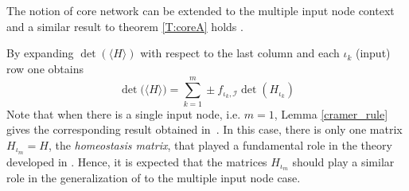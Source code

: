 \documentclass[a4paper,fleqn]{cas-dc}
\newcommand{\END}{\hfill\mbox{\raggedright \mbox{\raisebox{2pt}{\scalebox{0.6}{$\Diamond$}}}}\medskip}
\begin{document}
The notion of core network can be extended to the multiple input node context and a similar result to theorem \ref{T:coreA} holds \cite[Thm. 3.2]{madeira2022}.

By expanding $\det(\langle H \rangle)$ with respect to the last column and each $\iota_k$ (input) row one obtains 
\begin{equation} \label{xo'_reduced_expand}
\det\!\big(\langle H \rangle\big) = \sum_{k=1}^m \pm f_{\iota_k,\mathcal{I}} \det(H_{\iota_k})
\end{equation}
Note that when there is a single input node, i.e. $m=1$, Lemma \ref{cramer_rule} gives the corresponding result obtained in~\cite{wang2021}. 
In this case, there is only one matrix $H_{\iota_m}=H$, the \emph{homeostasis matrix}, that played a fundamental role in the theory developed in \cite{wang2021}. Hence, it is expected that the matrices $H_{\iota_m}$ should play a similar role in the generalization of \cite{wang2021} to the multiple input node case.

\end{document}
